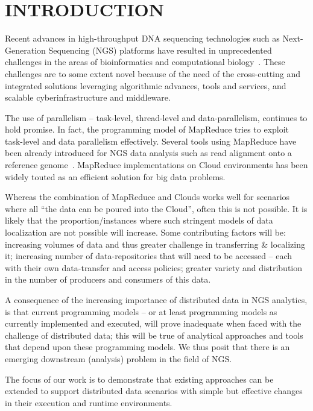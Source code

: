 \documentclass{acm_proc_article-sp}
\begin{document}
\section{INTRODUCTION} 

Recent advances in high-throughput DNA sequencing technologies such as
Next-Generation Sequencing (NGS) platforms have resulted in
unprecedented challenges in the areas of bioinformatics and
computational
biology~\cite{metzker2010,1000genome,wang2009-natrevgen,alex2009,mcpherson2009}.
These challenges are to some extent novel because of the need of the
cross-cutting and integrated solutions leveraging algorithmic
advances, tools and services, and scalable cyberinfrastructure and
middleware.


The use of parallelism -- task-level, thread-level and
data-parallelism, continues to hold promise. In fact, the programming
model of MapReduce tries to exploit task-level and data parallelism
effectively.  Several tools using MapReduce have been already
introduced for NGS data analysis such as read alignment onto a
reference genome~\cite{cloudburst,
  gatk,langmead2009,seal2011,langmead2010, taylor2010}.  MapReduce
implementations on Cloud environments has been widely touted as an
efficient solution for big data
problems\cite{mapreduce-2004-dean,schatz-nature-biotech-2010,
  taylor2010}.

Whereas the combination of MapReduce and Clouds works well for
scenarios where all ``the data can be poured into the Cloud'', often
this is not possible.  It is likely that the proportion/instances
where such stringent models of data localization are not possible will
increase.  Some contributing factors will be: increasing volumes of
data and thus greater challenge in transferring \& localizing it;
increasing number of data-repositories that will need to be accessed
-- each with their own data-transfer and access policies; greater
variety and distribution in the number of producers and consumers of
this data. 

A consequence of the increasing importance of distributed data in NGS
analytics, is that current programming models -- or at least
programming models as currently implemented and executed, will prove
inadequate when faced with the challenge of distributed data; this
will be true of analytical approaches and tools that depend upon these
programming models. We thus posit that there is an emerging downstream
(analysis) problem in the field of NGS. 

The focus of our work is to demonstrate that existing approaches can
be extended to support distributed data scenarios with simple but
effective changes in their execution and runtime environments.
\end{document}
